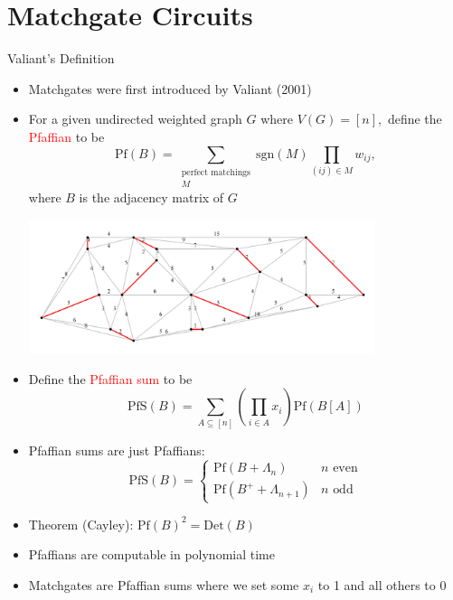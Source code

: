 \documentclass[xcolor=dvipsnames]{beamer}
\begin{document}
\section{Matchgate Circuits}

\begin{frame}{Valiant's Definition}
  \begin{itemize}
    \item Matchgates were first introduced by Valiant (2001)
    \item For a given undirected weighted graph $G$ where $V(G)=[n],$ define the \textcolor{red}{Pfaffian} to be
    \[\text{Pf}(B)=\sum_{\substack{\text{perfect matchings} \\ M}}\text{sgn}(M)\prod_{(ij)\in M}w_{ij},\]
    where $B$ is the adjacency matrix of $G$
    \begin{center}
      \includegraphics[width=0.8\textwidth]{perfmatch.jpg}
    \end{center}
  \end{itemize}
\end{frame}

\begin{frame}
  \begin{itemize}
    \item Define the \textcolor{red}{Pfaffian sum} to be 
    \[\text{PfS}(B)=\sum_{A\subseteq [n]}\left(\prod_{i\in A}x_i\right)\text{Pf}(B[A])\]
    \item Pfaffian sums are just Pfaffians:
    \[\text{PfS}(B)=
    \begin{cases}
      \text{Pf}(B+\Lambda_n) & n\text{ even}\\
      \text{Pf}(B^++\Lambda_{n+1}) & n\text{ odd}
    \end{cases}\]
    \item Theorem (Cayley): $\text{Pf}(B)^2=\text{Det}(B)$
    \item Pfaffians are computable in polynomial time
    \item Matchgates are Pfaffian sums where we set some $x_i$ to 1 and all others to 0
  \end{itemize}
\end{frame}
\end{document}
